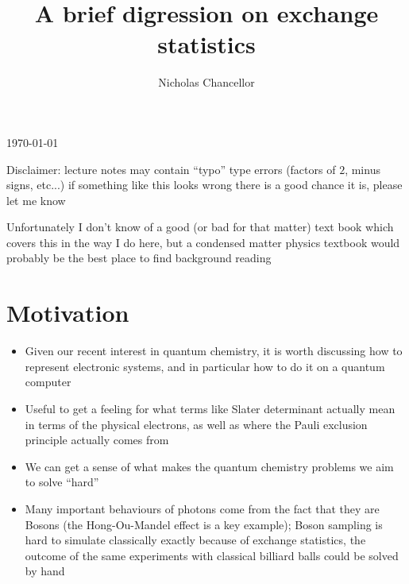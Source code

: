 \documentclass[english]{article}
\begin{document}
\title{A brief digression on exchange statistics}
\author{Nicholas Chancellor}


\maketitle


\today %


{\small Disclaimer: lecture notes may contain ``typo'' type errors (factors of $2$, minus signs, etc...) if something like this looks wrong there is a good chance it is, please let me know}

Unfortunately I don't know of a good (or bad for that matter) text book which covers this in the way I do here, but a condensed matter physics textbook would probably be the best place to find background reading

\section{Motivation}
\begin{itemize}
\item Given our recent interest in quantum chemistry, it is worth discussing how to represent electronic systems, and in particular how to do it on a quantum computer
\item  Useful to get a feeling for what terms like Slater determinant actually mean in terms of the physical electrons, as well as where the Pauli exclusion principle actually comes from
\item We can get a sense of what makes the quantum chemistry problems we aim to solve ``hard''
\item Many important behaviours of photons come from the fact that they are Bosons (the Hong-Ou-Mandel effect is a key example); Boson sampling is hard to simulate classically exactly because of exchange statistics, the outcome of the same experiments with classical billiard balls could be solved by hand
\end{itemize}
\end{document}
